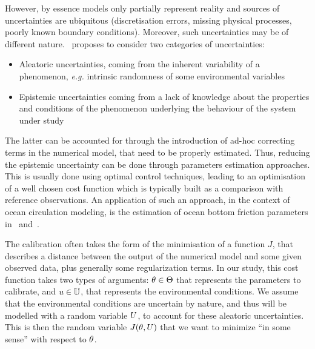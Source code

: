 \documentclass[../../Main_ManuscritThese.tex]{subfiles}
\begin{document}
\etoile

However, by essence models
only partially represent reality and sources of uncertainties are
ubiquitous (discretisation errors, missing physical processes, poorly
known boundary conditions). Moreover, such uncertainties may be of
different nature.~\cite{walker_defining_2003} proposes to consider two
categories of uncertainties:
\begin{itemize}
\item Aleatoric uncertainties, coming from the inherent variability of
a phenomenon, \emph{e.g.} intrinsic randomness of some environmental
variables
\item Epistemic uncertainties coming from a lack of knowledge about
the properties and conditions of the phenomenon underlying the
behaviour of the system under study
\end{itemize} The latter can be accounted for through the introduction
of ad-hoc correcting terms in the numerical model, that need to be
properly estimated. Thus, reducing the epistemic uncertainty can be
done through parameters estimation approaches. This is usually done
using optimal control techniques, leading to an optimisation of a well
chosen cost function which is typically built as a comparison with
reference observations.
  An application of such an approach, in the context of ocean
circulation modeling, is the estimation of ocean bottom friction
parameters in~\cite{das_estimation_1991}
and~\cite{boutet_estimation_2015}.

 
  
  The calibration often takes the form of the minimisation of a
function $J$, that describes a distance between the output of the
numerical model and some given observed data, plus generally some
regularization terms.  In our study, this cost function takes two
types of arguments: $\theta\in\Theta$ that represents the parameters to
calibrate, and $u\in\mathbb{U}$, that represents the environmental
conditions.  We assume that the environmental conditions are uncertain
by nature, and thus will be modelled with a random variable $U$, to
account for these aleatoric uncertainties.  This is then the random
variable $J(\theta,U)$ that we want to minimize ``in some sense'' with
respect to $\theta$.
\end{document}
